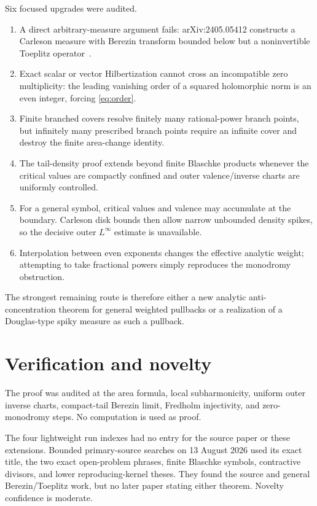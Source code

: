 \documentclass[11pt]{article}
\begin{document}
Six focused upgrades were audited.
\begin{enumerate}
\item A direct arbitrary-measure argument fails: arXiv:2405.05412 constructs
      a Carleson measure with Berezin transform bounded below but a
      noninvertible Toeplitz operator~\cite{CLZ}.
\item Exact scalar or vector Hilbertization cannot cross an incompatible zero
      multiplicity: the leading vanishing order of a squared holomorphic norm
      is an even integer, forcing \eqref{eq:order}.
\item Finite branched covers resolve finitely many rational-power branch
      points, but infinitely many prescribed branch points require an
      infinite cover and destroy the finite area-change identity.
\item The tail-density proof extends beyond finite Blaschke products whenever
      the critical values are compactly confined and outer valence/inverse
      charts are uniformly controlled.
\item For a general symbol, critical values and valence may accumulate at the
      boundary.  Carleson disk bounds then allow narrow unbounded density
      spikes, so the decisive outer $L^\infty$ estimate is unavailable.
\item Interpolation between even exponents changes the effective analytic
      weight; attempting to take fractional powers simply reproduces the
      monodromy obstruction.
\end{enumerate}
The strongest remaining route is therefore either a new analytic
anti-concentration theorem for general weighted pullbacks or a realization
of a Douglas-type spiky measure as such a pullback.

\section{Verification and novelty}

The proof was audited at the area formula, local subharmonicity, uniform
outer inverse charts, compact-tail Berezin limit, Fredholm injectivity, and
zero-monodromy steps.  No computation is used as proof.

The four lightweight run indexes had no entry for the source paper or these
extensions.  Bounded primary-source searches on 13 August 2026 used its exact
title, the two exact open-problem phrases, finite Blaschke symbols, contractive
divisors, and lower reproducing-kernel theses.  They found the source and
general Berezin/Toeplitz work, but no later paper stating either theorem.
Novelty confidence is moderate.
\end{document}
